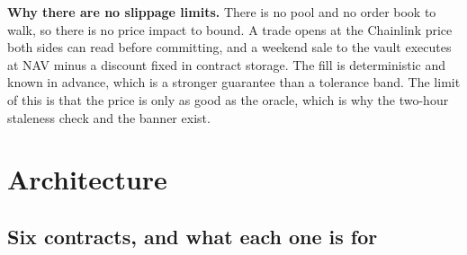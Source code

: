 \documentclass[11pt,a4paper]{article}
\begin{document}
\textbf{Why there are no slippage limits.} There is no pool and no order
book to walk, so there is no price impact to bound. A trade opens at the Chainlink price both sides
can read before committing, and a weekend sale to the vault executes at NAV minus a discount fixed
in contract storage. The fill is deterministic and known in advance, which is a stronger guarantee
than a tolerance band. The limit of this is that the price is only as good as the oracle, which is
why the two-hour staleness check and the banner exist.

\section{Architecture}\label{sec:arch}

\subsection{Six contracts, and what each one is for}
\end{document}
